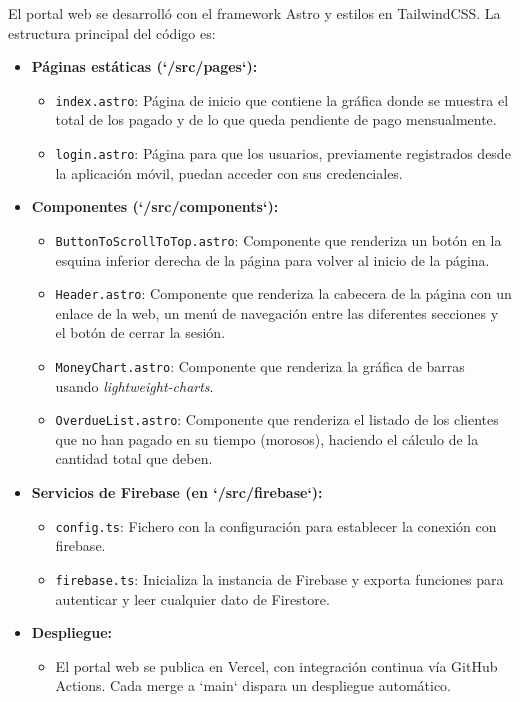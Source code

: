 \begin{large}

El portal web se desarrolló con el framework Astro y estilos en TailwindCSS. La estructura principal del código es:
\begin{itemize}
  \item \textbf{Páginas estáticas (`/src/pages`):}  
    \begin{itemize}
      \item \texttt{index.astro}: Página de inicio que contiene la gráfica donde se muestra el total de los pagado y de lo que queda pendiente de pago mensualmente.
      \item \texttt{login.astro}: Página para que los usuarios, previamente registrados desde la aplicación móvil, puedan acceder con sus credenciales.
    \end{itemize}
  \item \textbf{Componentes (`/src/components`):}  
    \begin{itemize}
      \item \texttt{ButtonToScrollToTop.astro}: Componente que renderiza un botón en la esquina inferior derecha de la página para volver al inicio de la página.
      \item \texttt{Header.astro}: Componente que renderiza la cabecera de la página con un enlace de la web, un menú de navegación entre las diferentes secciones y el botón de cerrar la sesión.
      \item \texttt{MoneyChart.astro}: Componente que renderiza la gráfica de barras usando \textit{lightweight-charts}.
      \item \texttt{OverdueList.astro}: Componente que renderiza el listado de los clientes que no han pagado en su tiempo (morosos), haciendo el cálculo de la cantidad total que deben.
    \end{itemize}
  \item \textbf{Servicios de Firebase (en `/src/firebase`):}  
    \begin{itemize}
      \item \texttt{config.ts}: Fichero con la configuración para establecer la conexión con firebase.
      \item \texttt{firebase.ts}: Inicializa la instancia de Firebase y exporta funciones para autenticar y leer cualquier dato de Firestore.
    \end{itemize}
  \item \textbf{Despliegue:}  
    \begin{itemize}
      \item El portal web se publica en Vercel, con integración continua vía GitHub Actions. Cada merge a `main` dispara un despliegue automático.
    \end{itemize}
\end{itemize}

\end{large}

